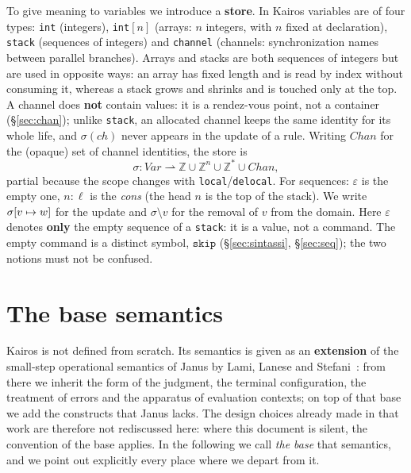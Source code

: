 \noindent
To give meaning to variables we introduce a \textbf{store}. In Kairos
variables are of four types: \texttt{int} (integers), \texttt{int}$[n]$
(arrays: $n$ integers, with $n$ fixed at declaration), \texttt{stack}
(sequences of integers) and \texttt{channel} (channels: synchronization names between
parallel branches). Arrays and stacks are both sequences of integers but are used in
opposite ways: an array has fixed length and is read by index without
consuming it, whereas a stack grows and shrinks and is touched only at the top. A channel does \textbf{not} contain values: it is a
rendez-vous point, not a container (\S\ref{sec:chan}); unlike
\texttt{stack}, an allocated channel keeps the same identity for
its whole life, and $\sigma(\mathit{ch})$ never appears in the
update of a rule. Writing $\mathit{Chan}$ for the (opaque) set of
channel identities, the store is
\[
\sigma : \mathit{Var} \rightharpoonup \mathbb{Z} \cup \mathbb{Z}^{n} \cup \mathbb{Z}^{*} \cup \mathit{Chan},
\]
partial because the scope changes with \texttt{local}/\texttt{delocal}. For
sequences: $\varepsilon$ is the empty one, $n : \ell$ is the \emph{cons} (the head $n$
is the top of the stack). We write $\sigma[v \mapsto w]$ for the update and
$\sigma \setminus v$ for the removal of $v$ from the domain. Here $\varepsilon$ denotes
\textbf{only} the empty sequence of a \texttt{stack}: it is a value, not a
command. The empty command is a distinct symbol, $\mathtt{skip}$
(\S\ref{sec:sintassi}, \S\ref{sec:seq}); the two notions must not be confused.

\section{The base semantics}
\label{sec:base}

Kairos is not defined from scratch. Its semantics is given as an
\textbf{extension} of the small-step operational semantics of Janus by Lami,
Lanese and Stefani~\cite{LamiLaneseStefani2024}: from there we inherit the form of
the judgment, the terminal configuration, the treatment of errors and
the apparatus of evaluation contexts; on top of that base we add the constructs
that Janus lacks. The design choices already made in that work are
therefore not rediscussed here: where this document is silent, the convention
of the base applies. In the following we call \emph{the base} that semantics, and
we point out explicitly every place where we depart from it.

